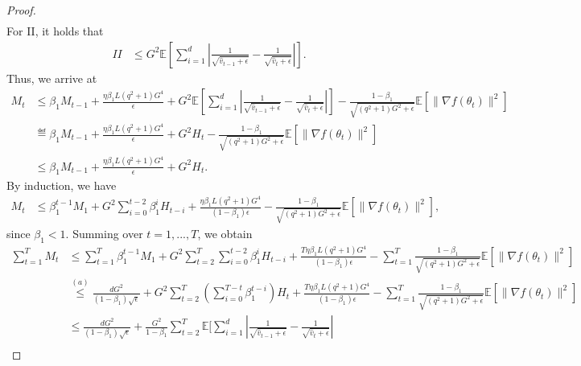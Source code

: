 \documentclass[11pt]{article}
\begin{document}
\begin{proof}
\begin{align*}
\end{align*}
For II, it holds that
\begin{align*}
    II&\leq G^2 \mathbb E[\sum_{i=1}^d |\frac{1}{\sqrt{\hat v_{t-1}+\epsilon}}-\frac{1}{\sqrt{\hat v_t+\epsilon}}| ].
\end{align*}
Thus, we arrive at
\begin{align*}
    M_t&\leq \beta_1 M_{t-1}+\frac{\eta\beta_1 L(q^2+1)G^4}{\epsilon}+G^2 \mathbb E[\sum_{i=1}^d |\frac{1}{\sqrt{\hat v_{t-1}+\epsilon}}-\frac{1}{\sqrt{\hat v_t+\epsilon}}| ]-\frac{1-\beta_1}{\sqrt{(q^2+1)G^2+\epsilon}}\mathbb E[\|\nabla f(\theta_t)\|^2]\\
    &\eqdef \beta_1 M_{t-1}+\frac{\eta\beta_1 L(q^2+1)G^4}{\epsilon}+G^2 H_t-\frac{1-\beta_1}{\sqrt{(q^2+1)G^2+\epsilon}}\mathbb E[\|\nabla f(\theta_t)\|^2]\\
    &\leq \beta_1 M_{t-1}+\frac{\eta\beta_1 L(q^2+1)G^4}{\epsilon}+G^2 H_t.
\end{align*}
By induction, we have
\begin{align*}
    M_t&\leq \beta_1^{t-1} M_1+G^2 \sum_{i=0}^{t-2} \beta_1^i H_{t-i}+ \frac{\eta\beta_1 L(q^2+1)G^4}{(1-\beta_1)\epsilon}-\frac{1-\beta_1}{\sqrt{(q^2+1)G^2+\epsilon}}\mathbb E[\|\nabla f(\theta_t)\|^2],
\end{align*}
since $\beta_1<1$. Summing over $t=1,...,T$, we obtain
\begin{align*}
    \sum_{t=1}^T M_t&\leq \sum_{t=1}^T \beta_1^{t-1} M_1+G^2\sum_{t=2}^T \sum_{i=0}^{t-2} \beta_1^i H_{t-i}+ \frac{T \eta\beta_1 L(q^2+1)G^4}{(1-\beta_1)\epsilon}-\sum_{t=1}^T \frac{1-\beta_1}{\sqrt{(q^2+1)G^2+\epsilon}}\mathbb E[\|\nabla f(\theta_t)\|^2]\\
    &\overset{(a)}{\leq} \frac{dG^2}{(1-\beta_1)\sqrt\epsilon}+G^2\sum_{t=2}^T (\sum_{i=0}^{T-t} \beta_1^{t-i})H_t+ \frac{T \eta\beta_1 L(q^2+1)G^4}{(1-\beta_1)\epsilon}-\sum_{t=1}^T \frac{1-\beta_1}{\sqrt{(q^2+1)G^2+\epsilon}}\mathbb E[\|\nabla f(\theta_t)\|^2]\\
    &\leq \frac{dG^2}{(1-\beta_1)\sqrt\epsilon}+\frac{G^2}{1-\beta_1}\sum_{t=2}^T \mathbb E[\sum_{i=1}^d |\frac{1}{\sqrt{\hat v_{t-1}+\epsilon}}-\frac{1}{\sqrt{\hat v_t+\epsilon}}|\\

\end{align*}
\end{proof}
\end{document}
